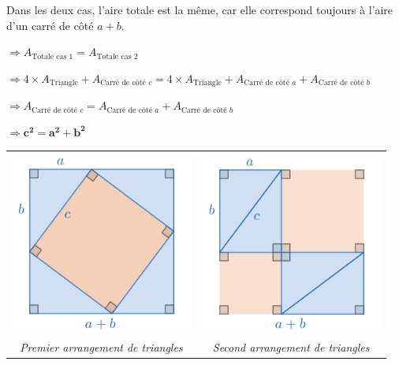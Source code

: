 \documentclass[a4paper, twoside]{article}
\begin{document}
\medbreak

Dans les deux cas, l'aire totale est la même, 
car elle correspond toujours à l'aire d'un carré
de côté $a+b$.

\smallbreak

$\Longrightarrow A_{\text{Totale cas 1}} = A_{\text{Totale cas 2}}$

\smallbreak

$\Longrightarrow 4 \times A_{\text{Triangle}} + A_{\text{Carré de côté }c} = 4 \times A_{\text{Triangle}} + A_{\text{Carré de côté }a} + A_{\text{Carré de côté }b}$

\smallbreak

$\Longrightarrow A_{\text{Carré de côté }c} = A_{\text{Carré de côté }a} + A_{\text{Carré de côté }b}$

\smallbreak

$\Longrightarrow \mathbf{c^2 = a^2 + b^2}$


\begin{center}
	\begin{tabular}{cc}
		\includegraphics[width=6cm]{Image/Pythagore/laisnez_cas_1.png} & \includegraphics[width=6cm]{Image/Pythagore/laisnez_cas_2.png} \\
		\textit{Premier arrangement de triangles}                      & \textit{Second arrangement de triangles}                       \\
	\end{tabular}
\end{center}
\end{document}
